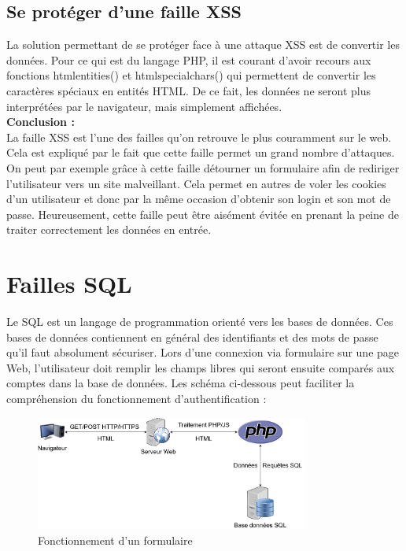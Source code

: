 \subsection{Se protéger d'une faille XSS}

La solution permettant de se protéger face à une attaque XSS est de convertir les données. Pour ce qui est du langage PHP, il est courant d’avoir recours aux fonctions htmlentities() et htmlspecialchars() qui permettent de convertir les caractères spéciaux en entités HTML. De ce fait, les données ne seront plus interprétées par le navigateur, mais simplement affichées.\\

\noindent \textbf{Conclusion : }\\

La faille XSS est l’une des failles qu’on retrouve le plus couramment sur le web. Cela est expliqué par le fait que cette faille permet un grand nombre d’attaques. On peut par exemple grâce à cette faille détourner un formulaire afin de rediriger l’utilisateur vers un site malveillant. Cela permet en autres de voler les cookies d’un utilisateur et donc par la même occasion d’obtenir son login et son mot de passe.
Heureusement, cette faille peut être aisément évitée en prenant la peine de traiter correctement les données en entrée.



\section{Failles SQL}

Le SQL est un langage de programmation orienté vers les bases de données. Ces bases de données contiennent en général des identifiants et des mots de passe qu'il faut absolument sécuriser. Lors d'une connexion via formulaire sur une page Web, l'utilisateur doit remplir les champs libres qui seront ensuite comparés aux comptes dans la base de données. Les schéma ci-dessous peut faciliter la compréhension du fonctionnement d'authentification :

\begin{figure}[htp!]
  \centering
  \setlength\figureheight{7cm}
  \setlength\figurewidth{9cm}
  \includegraphics[width=0.8\textwidth]{oui/Ancien/imangeancien/SQLi/SQLDiagram.png}
  \caption{Fonctionnement d'un formulaire}
  \label{fig:courbe-tikz}
\end{figure}

